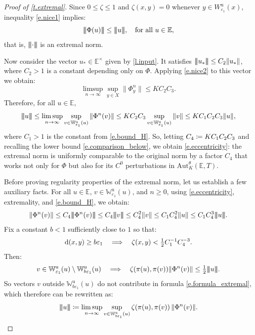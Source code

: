 \documentclass[10pt]{amsart}
\def\vcentcolon{\mathrel{\mathop\ordinarycolon}}
\providecommand\ordinarycolon{:}
\providecommand*\coloneqq{\vcentcolon\mathrel{\mkern-1.2mu}=}
\newcommand\implique{\mathchoice{\Longrightarrow}{\Rightarrow}{\Rightarrow}{\Rightarrow}}
\theoremstyle{plain}
\theoremstyle{definition}
\newcommand{\tribar}[1]{\mathopen{| {\kern -1.5pt} | {\kern -1.5pt} |} {#1}
\mathclose{| {\kern -1.5pt} | {\kern -1.5pt} |}}
\newcommand{\EE}{\mathbb{E}}
\newcommand{\WW}{\mathbb{W}}
\newcommand{\dd}{\mathrm{d}}
\newcommand{\uu}{\mathrm{u}}
\newcommand{\Aut}{\mathrm{Aut}}
\let\epsilon\varepsilon
\begin{document}
\begin{proof}[Proof of \cref{t.extremal}]
Since $0 \le \zeta \le 1$ and $\zeta(x,y) = 0$ whenever $y \in W^\uu_{\epsilon_1}(x)$, inequality \eqref{e.nice1} implies:
\[
\tribar{\Phi(u)} \le \tribar{u}, \quad\text{for all } u \in \EE,
\]
that is, $\tribar{\mathord{\cdot}}$ is an extremal norm.

Now consider the vector $u_* \in \EE^\times$ given by \cref{l.input}.
It satisfies $\tribar{u_*} \le C_2 \|u_*\|$, where $C_2>1$ is a constant depending only on $\Phi$.
Applying \eqref{e.nice2} to this vector we obtain:
\[
\limsup_{n \to \infty} \sup_{y \in X} \|\Phi^n_y \| \le K C_2 C_3.
\]
Therefore, for all $u \in \EE$,
\[
\tribar{u} \le \limsup_{n \to \infty} \sup_{v \in \WW^\uu_{\epsilon_1}(u)} \| \Phi^n (v) \|
\le K C_2 C_3 \sup_{v \in \WW^\uu_{\epsilon_1}(u)} \| v \|
\le K C_1 C_2 C_3 \|u\|,
\]
where $C_1 > 1$ is the constant from \eqref{e.bound_H}.
So, letting $C_4 \coloneqq K C_1 C_2 C_3$ and recalling the lower bound \eqref{e.comparison_below}, we obtain \eqref{e.eccentricity}: the extremal norm is uniformly comparable to the original norm by a factor $C_4$ that works not only for $\Phi$ but also for its $C^0$ perturbations in $\Aut^\theta_K(\EE,T)$.

Before proving regularity properties of the extremal norm, let us establish a few auxiliary facts.
For all $u \in \EE$, $v \in \WW^\uu_{\epsilon_1}(u)$, and $n\ge 0$, using \eqref{e.eccentricity}, extremality, and \eqref{e.bound_H}, we obtain:
\begin{equation}\label{e.nice3}
\| \Phi^n (v) \| \le C_4 \tribar{\Phi^n(v)} \le C_4 \tribar{v} \le C_4^2 \| v\| \le C_1 C_4^2 \|u\| \le C_1 C_4^3 \tribar{u}.
\end{equation}
Fix a constant $b<1$ sufficiently close to $1$ so that:
\[
\dd(x,y) \ge b\epsilon_1 \quad \implique \quad
\zeta(x,y) < \tfrac{1}{2} C_1^{-1} C_4^{-3}.
\]
Then:
\[
v \in \WW^\uu_{\epsilon_1}(u) \setminus \WW^\uu_{b\epsilon_1}(u) \quad \implique \quad
\zeta(\pi(u),\pi(v)) \| \Phi^n (v) \| \le \tfrac{1}{2}\tribar{u}.
\]
So vectors $v$ outside $\WW^\uu_{b\epsilon_1}(u)$ do not contribute in formula \eqref{e.formula_extremal}, which therefore can be rewritten as:
\begin{equation}\label{e.cutoff}
\tribar{u} \coloneqq \limsup_{n \to \infty} \sup_{v \in \WW^\uu_{b\epsilon_1}(u)} \zeta(\pi(u),\pi(v)) \, \| \Phi^n (v) \|.	
\end{equation}


\end{proof}
\end{document}
